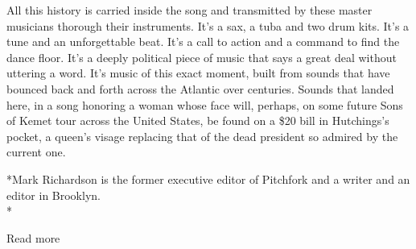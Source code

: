 All this history is carried inside the song and transmitted by these
master musicians thorough their instruments. It's a sax, a tuba and two
drum kits. It's a tune and an unforgettable beat. It's a call to action
and a command to find the dance floor. It's a deeply political piece of
music that says a great deal without uttering a word. It's music of this
exact moment, built from sounds that have bounced back and forth across
the Atlantic over centuries. Sounds that landed here, in a song honoring
a woman whose face will, perhaps, on some future Sons of Kemet tour
across the United States, be found on a \$20 bill in Hutchings's pocket,
a queen's visage replacing that of the dead president so admired by the
current one.

*Mark Richardson is the former executive editor of Pitchfork and a
writer and an editor in Brooklyn.\\
*

Read more

\subsection{}

